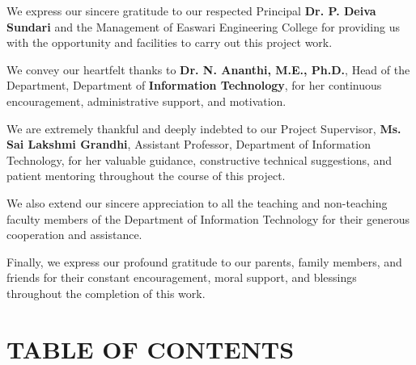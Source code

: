 \documentclass[12pt,a4paper,oneside]{report}
\begin{document}
We express our sincere gratitude to our respected Principal \textbf{Dr. P. Deiva Sundari} and the Management of Easwari Engineering College for providing us with the opportunity and facilities to carry out this project work.

We convey our heartfelt thanks to \textbf{Dr. N. Ananthi, M.E., Ph.D.}, Head of the Department, Department of \textbf{Information Technology}, for her continuous encouragement, administrative support, and motivation.

We are extremely thankful and deeply indebted to our Project Supervisor, \textbf{Ms. Sai Lakshmi Grandhi}, Assistant Professor, Department of Information Technology, for her valuable guidance, constructive technical suggestions, and patient mentoring throughout the course of this project.

We also extend our sincere appreciation to all the teaching and non-teaching faculty members of the Department of Information Technology for their generous cooperation and assistance.

Finally, we express our profound gratitude to our parents, family members, and friends for their constant encouragement, moral support, and blessings throughout the completion of this work.

\clearpage

\chapter*{TABLE OF CONTENTS}
\end{document}
